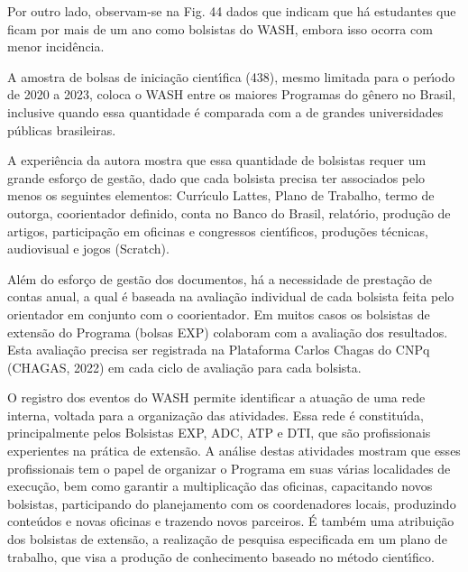 \documentclass[
12pt,		%
openright,	%
twoside,  %
a4paper,			%
chapter=TITLE,		%
english,			%
french,				%
spanish,			%
brazil				%
]{USPSC-classe/USPSC}
\begin{document}
Por outro lado, observam-se na Fig. 44 dados que indicam que h\'a estudantes que ficam por mais de um ano como bolsistas do WASH, embora isso ocorra com menor incid\^encia.









A amostra de bolsas de inicia\c{c}\~ao cient\'{\i}fica (438), mesmo limitada para o per\'{\i}odo de 2020 a 2023, coloca o WASH entre os maiores Programas do g\^enero no Brasil, inclusive quando essa quantidade \'e comparada com a de grandes universidades p\'ublicas brasileiras.









A experi\^encia da autora mostra que essa quantidade de bolsistas requer um grande esfor\c{c}o de gest\~ao, dado que cada bolsista precisa ter associados pelo menos os seguintes elementos: Curr\'{\i}culo Lattes, Plano de Trabalho, termo de outorga, coorientador definido, conta no Banco do Brasil, relat\'orio, produ\c{c}\~ao de artigos, participa\c{c}\~ao em oficinas e congressos cient\'{\i}ficos, produ\c{c}\~oes t\'ecnicas, audiovisual e jogos (Scratch).









Al\'em do esfor\c{c}o de gest\~ao dos documentos, h\'a a necessidade de presta\c{c}\~ao de contas anual, a qual \'e baseada na avalia\c{c}\~ao individual de cada bolsista feita pelo orientador em conjunto com o coorientador. Em muitos casos os bolsistas de extens\~ao do Programa (bolsas EXP) colaboram com a avalia\c{c}\~ao dos resultados. Esta avalia\c{c}\~ao precisa ser registrada na Plataforma Carlos Chagas do CNPq (CHAGAS, 2022) em cada ciclo de avalia\c{c}\~ao para cada bolsista.









O registro dos eventos do WASH permite identificar a atua\c{c}\~ao de uma rede interna, voltada para a organiza\c{c}\~ao das atividades. Essa rede \'e constitu\'{\i}da, principalmente pelos  Bolsistas EXP, ADC, ATP e DTI, que s\~ao profissionais experientes na pr\'atica de extens\~ao. A an\'alise destas atividades mostram que esses profissionais tem o papel de organizar o Programa em suas v\'arias localidades de execu\c{c}\~ao, bem como garantir a multiplica\c{c}\~ao das oficinas, capacitando novos bolsistas, participando do planejamento com os coordenadores locais, produzindo conte\'udos e novas oficinas e trazendo novos parceiros. \'E tamb\'em uma atribui\c{c}\~ao dos bolsistas de extens\~ao, a realiza\c{c}\~ao de pesquisa especificada em um plano de trabalho, que visa a produ\c{c}\~ao de conhecimento baseado no m\'etodo cient\'{\i}fico.
\end{document}
